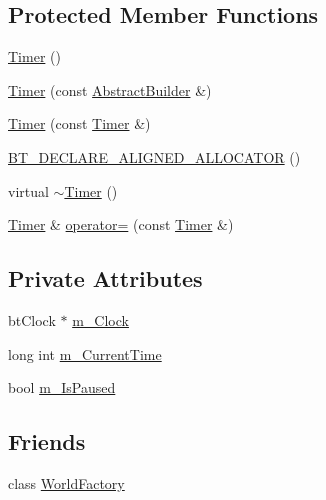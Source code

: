\subsection*{Protected Member Functions}
\begin{DoxyCompactItemize}
\item 
\mbox{\hyperlink{classnjli_1_1_timer_afcd00947fc6d6c3a3a956ed57b4cd18b}{Timer}} ()
\item 
\mbox{\hyperlink{classnjli_1_1_timer_a3cc6b1b2968ae74823383e0cd84c5d78}{Timer}} (const \mbox{\hyperlink{classnjli_1_1_abstract_builder}{Abstract\+Builder}} \&)
\item 
\mbox{\hyperlink{classnjli_1_1_timer_a9cfd12bef5e562a48bc5e5ca033c6a7c}{Timer}} (const \mbox{\hyperlink{classnjli_1_1_timer}{Timer}} \&)
\item 
\mbox{\hyperlink{classnjli_1_1_timer_a982eac44a0cf0e6f3423de427d6035b6}{B\+T\+\_\+\+D\+E\+C\+L\+A\+R\+E\+\_\+\+A\+L\+I\+G\+N\+E\+D\+\_\+\+A\+L\+L\+O\+C\+A\+T\+OR}} ()
\item 
virtual \mbox{\hyperlink{classnjli_1_1_timer_a9f546ad77cbaa48c45c69dff850e2f8b}{$\sim$\+Timer}} ()
\item 
\mbox{\hyperlink{classnjli_1_1_timer}{Timer}} \& \mbox{\hyperlink{classnjli_1_1_timer_a237da5742e5491edf681e2dda94a02d9}{operator=}} (const \mbox{\hyperlink{classnjli_1_1_timer}{Timer}} \&)
\end{DoxyCompactItemize}
\subsection*{Private Attributes}
\begin{DoxyCompactItemize}
\item 
bt\+Clock $\ast$ \mbox{\hyperlink{classnjli_1_1_timer_a4ffbc32862501214a88aaa1bb74612a6}{m\+\_\+\+Clock}}
\item 
long int \mbox{\hyperlink{classnjli_1_1_timer_a1ae3795457187736970ee2af90ae3a11}{m\+\_\+\+Current\+Time}}
\item 
bool \mbox{\hyperlink{classnjli_1_1_timer_a41a4f6b6f65df4beef065232a19b45d7}{m\+\_\+\+Is\+Paused}}
\end{DoxyCompactItemize}
\subsection*{Friends}
\begin{DoxyCompactItemize}
\item 
class \mbox{\hyperlink{classnjli_1_1_timer_acb96ebb09abe8f2a37a915a842babfac}{World\+Factory}}
\end{DoxyCompactItemize}


